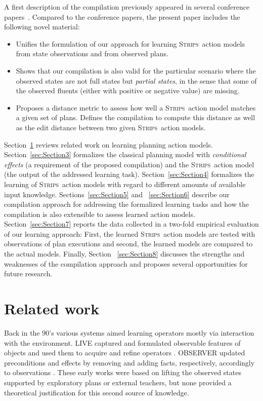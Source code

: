 \documentclass[3p,times]{elsarticle}
\newcommand{\strips}{\textsc{Strips}}     %
\begin{document}
A first description of the compilation previously appeared in several conference papers~\cite{aineto2018learning}. Compared to the conference papers, the present paper includes the following novel material:
\begin{itemize}
\item Unifies the formulation of our approach for learning \strips\ action models from state observations and from observed plans.
\item Shows that our compilation is also valid for the particular scenario where the observed states are not full states but {\em partial states}, in the sense that some of the observed fluents (either with positive or negative value) are missing.
\item Proposes a distance metric to assess how well a \strips\ action model matches a given set of plans. Defines the compilation to compute this distance as well as the edit distance between two given \strips\ action models.
\end{itemize}  

Section~\ref{sec:Section2} reviews related work on learning planning action models. Section~\ref{sec:Section3} formalizes the classical planning model with {\em conditional effects} (a requirement of the proposed compilation) and the \strips\ action model (the output of the addressed learning task). Section~\ref{sec:Section4} formalizes the learning of \strips\ action models with regard to different amounts of available input knowledge. Sections~\ref{sec:Section5} and ~\ref{sec:Section6} describe our compilation approach for addressing the formalized learning tasks and how the compilation is also extensible to assess learned action models. Section~\ref{sec:Section7} reports the data collected in a two-fold empirical evaluation of our learning approach: First, the learned \strips\ action models are tested with observations of plan executions and second, the learned models are compared to the actual models. Finally, Section ~\ref{sec:Section8} discusses the strengths and weaknesses of the compilation approach and proposes several opportunities for future research.



\section{Related work}
\label{sec:Section2}
Back in the 90's various systems aimed learning operators mostly via interaction with the environment. {\sc LIVE} captured and formulated observable features of objects and used them to acquire and refine operators \cite{ShenS89}. {\sc OBSERVER} updated preconditions and effects by removing and adding facts, respectively, accordingly to observations \cite{Wang95learningby}. These early works were based on lifting the observed states supported by exploratory plans or external teachers, but none provided a theoretical justification for this second source of knowledge.
\end{document}
